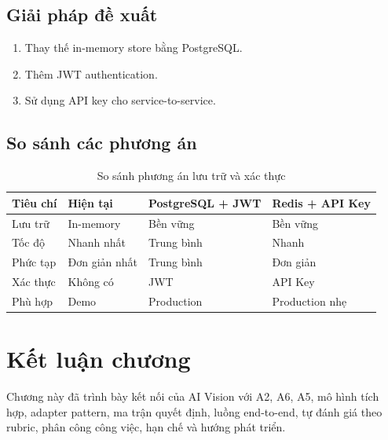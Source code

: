 \subsection{Giải pháp đề xuất}

\begin{enumerate}
    \item Thay thế in-memory store bằng PostgreSQL.
    \item Thêm JWT authentication.
    \item Sử dụng API key cho service-to-service.
\end{enumerate}

\subsection{So sánh các phương án}

\begin{table}[H]
\centering
\caption{So sánh phương án lưu trữ và xác thực}
\label{tab:security-options}
\ReportTableFont
\begin{tabular}{|>{\raggedright\arraybackslash}p{3cm}|>{\raggedright\arraybackslash}p{3.2cm}|>{\raggedright\arraybackslash}p{3.2cm}|>{\raggedright\arraybackslash}p{3.2cm}|}
\hline
\textbf{Tiêu chí} & \textbf{Hiện tại} & \textbf{PostgreSQL + JWT} & \textbf{Redis + API Key} \\
\hline
Lưu trữ & In-memory & Bền vững & Bền vững \\
\hline
Tốc độ & Nhanh nhất & Trung bình & Nhanh \\
\hline
Phức tạp & Đơn giản nhất & Trung bình & Đơn giản \\
\hline
Xác thực & Không có & JWT & API Key \\
\hline
Phù hợp & Demo & Production & Production nhẹ \\
\hline
\end{tabular}
\normalsize
{}
\end{table}

\section{Kết luận chương}

Chương này đã trình bày kết nối của AI Vision với A2, A6, A5, mô hình tích hợp, adapter pattern, ma trận quyết định, luồng end-to-end, tự đánh giá theo rubric, phân công công việc, hạn chế và hướng phát triển.

